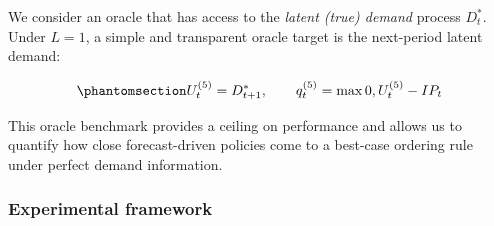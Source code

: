 \documentclass[
  authoryear,
  doubleblind,
  3p]{elsarticle}
\begin{document}
We consider an oracle that has access to the \emph{latent (true) demand}
process \(D_t^*\). Under \(L=1\), a simple and transparent oracle target
is the next-period latent demand:

\begin{equation}\phantomsection\label{eq-ut5}{
U_t^{(5)} = D_{t+1}^*,
\qquad
q_t^{(5)} = \max{0, U_t^{(5)} - IP_t}
}\end{equation}

This oracle benchmark provides a ceiling on performance and allows us to
quantify how close forecast-driven policies come to a best-case ordering
rule under perfect demand information.

\subsubsection{Experimental framework}\label{experimental-framework}
\end{document}
